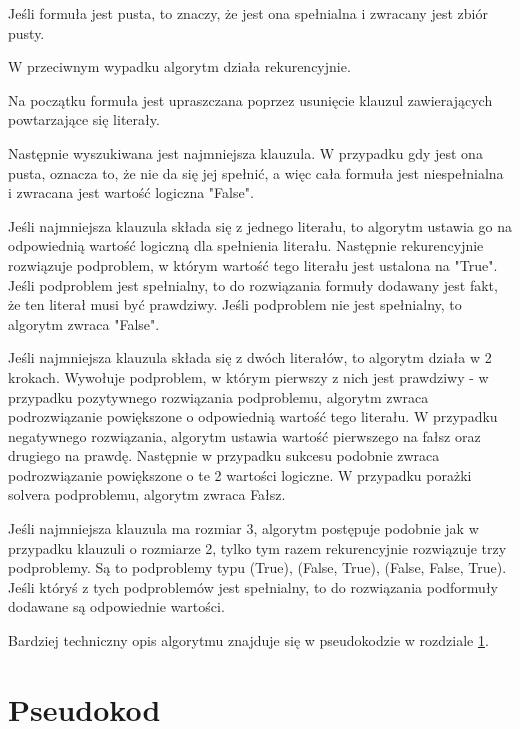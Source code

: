 \documentclass[a4paper,10pt,twoside]{report}
\theoremstyle{definition}
\begin{document}
Jeśli formuła jest pusta, to znaczy, że jest ona spełnialna i zwracany jest zbiór pusty.

W przeciwnym wypadku algorytm działa rekurencyjnie.

Na początku formuła jest upraszczana poprzez usunięcie klauzul zawierających powtarzające się literały.

Następnie wyszukiwana jest najmniejsza klauzula. W przypadku gdy jest ona pusta, oznacza to, że nie da się jej spełnić, a więc cała formuła jest niespełnialna i zwracana jest wartość logiczna "False".

Jeśli najmniejsza klauzula składa się z jednego literału, to algorytm ustawia go na odpowiednią wartość logiczną dla spełnienia literału. Następnie rekurencyjnie rozwiązuje podproblem, w którym wartość tego literału jest ustalona na "True". Jeśli podproblem jest spełnialny, to do rozwiązania formuły dodawany jest fakt, że ten literał musi być prawdziwy. Jeśli podproblem nie jest spełnialny, to algorytm zwraca "False".

Jeśli najmniejsza klauzula składa się z dwóch literałów, to algorytm działa w 2 krokach. Wywołuje podproblem, w którym pierwszy z nich jest prawdziwy - w przypadku pozytywnego rozwiązania podproblemu, algorytm zwraca podrozwiązanie powiększone o odpowiednią wartość tego literału. W przypadku negatywnego rozwiązania, algorytm ustawia wartość pierwszego na fałsz oraz drugiego na prawdę. Następnie w przypadku sukcesu podobnie zwraca podrozwiązanie powiększone o te 2 wartości logiczne. W przypadku porażki solvera podproblemu, algorytm zwraca Fałsz.

Jeśli najmniejsza klauzula ma rozmiar 3, algorytm postępuje podobnie jak w przypadku klauzuli o rozmiarze 2, tylko tym razem rekurencyjnie rozwiązuje trzy podproblemy. Są to podproblemy typu (True), (False, True), (False, False, True). Jeśli któryś z tych podproblemów jest spełnialny, to do rozwiązania podformuły dodawane są odpowiednie wartości.

Bardziej techniczny opis algorytmu znajduje się w pseudokodzie w rozdziale \ref{sec:pseudokod}.

\section{Pseudokod}
\label{sec:pseudokod}
\end{document}
